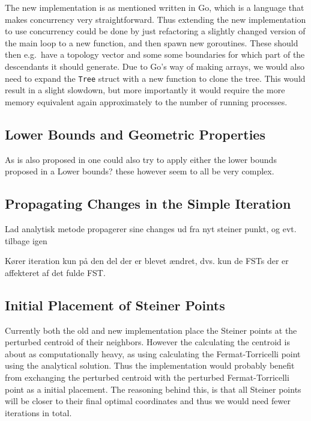 The new implementation is as mentioned written in Go, which is a language that
makes concurrency very straightforward. Thus extending the new implementation to
use concurrency could be done by just refactoring a slightly changed version of
the main loop to a new function, and then spawn new goroutines. These should
then e.g.\ have a topology vector and some some boundaries for which part of the
descendants it should generate. Due to Go's way of making arrays, we would also
need to expand the \texttt{Tree} struct with a new function to clone the tree.
This would result in a slight slowdown, but more importantly it would require
the more memory equivalent again approximately to the number of running
processes.

\subsection{Lower Bounds and Geometric Properties}
\label{sec:lower-bounds-geom}

As is also proposed in \textcite{fonseca2014} one could also try to apply either
the lower bounds proposed in \textcite{fampa2008} a
Lower bounds? these however seem to all be very complex.

\subsection{Propagating Changes in the Simple Iteration}
\label{sec:prop-chang-simple}

Lad analytisk metode propagerer sine changes ud fra nyt steiner punkt, og
evt. tilbage igen

Kører iteration kun på den del der er blevet ændret, dvs. kun de FSTs der er
affekteret af det fulde FST.

\subsection{Initial Placement of Steiner Points}
\label{sec:init-plac-stein}

Currently both the old and new implementation place the Steiner points at the
perturbed centroid of their neighbors. However the calculating the centroid is
about as computationally heavy, as using calculating the Fermat-Torricelli point
using the analytical solution. Thus the implementation would probably benefit
from exchanging the perturbed centroid with the perturbed Fermat-Torricelli
point as a initial placement. The reasoning behind this, is that all Steiner
points will be closer to their final optimal coordinates and thus we would need
fewer iterations in total.

